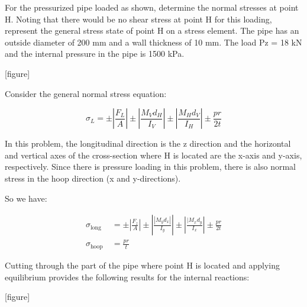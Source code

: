 \documentclass[
  letterpaper,
  DIV=11,
  numbers=noendperiod]{scrreprt}
\begin{document}
\begin{tcolorbox}[enhanced jigsaw, breakable, opacityback=0, toptitle=1mm, left=2mm, colback=white, opacitybacktitle=0.6, colframe=quarto-callout-note-color-frame, titlerule=0mm, arc=.35mm, leftrule=.75mm, bottomtitle=1mm, colbacktitle=quarto-callout-note-color!10!white, rightrule=.15mm, title={Example 14.4:}, bottomrule=.15mm, toprule=.15mm, coltitle=black]

For the pressurized pipe loaded as shown, determine the normal stresses
at point H. Noting that there would be no shear stress at point H for
this loading, represent the general stress state of point H on a stress
element. The pipe has an outside diameter of 200 mm and a wall thickness
of 10 mm. The load Pz = 18 kN and the internal pressure in the pipe is
1500 kPa.

{[}figure{]}

\begin{tcolorbox}[enhanced jigsaw, breakable, opacityback=0, toptitle=1mm, left=2mm, colback=white, opacitybacktitle=0.6, colframe=quarto-callout-note-color-frame, titlerule=0mm, arc=.35mm, leftrule=.75mm, bottomtitle=1mm, colbacktitle=quarto-callout-note-color!10!white, rightrule=.15mm, title={Solution}, bottomrule=.15mm, toprule=.15mm, coltitle=black]

Consider the general normal stress equation:

\[
\sigma_L= \pm\left|\frac{F_L}{A}\right| \pm\left|\frac{M_V d_H}{I_V}\right| \pm\left|\frac{M_H d_V}{I_H}\right| \pm \frac{p r}{2 t}
\]

In this problem, the longitudinal direction is the z direction and the
horizontal and vertical axes of the cross-section where H is located are
the x-axis and y-axis, respectively. Since there is pressure loading in
this problem, there is also normal stress in the hoop direction (x and
y-directions).

So we have:

\[
\begin{aligned}
\sigma_{\text {long }} & = \pm\left|\frac{F_z}{A}\right| \pm\left|\frac{\left|M_y d_x\right|}{I_y}\right| \pm\left|\frac{\mid M_x d_y}{I_x}\right| \pm \frac{p r}{2 t} \\
\sigma_{\text {hoop }} & =\frac{p r}{t}
\end{aligned}
\]

Cutting through the part of the pipe where point H is located and
applying equilibrium provides the following results for the internal
reactions:

{[}figure{]}


\end{tcolorbox}
\end{tcolorbox}
\end{document}
